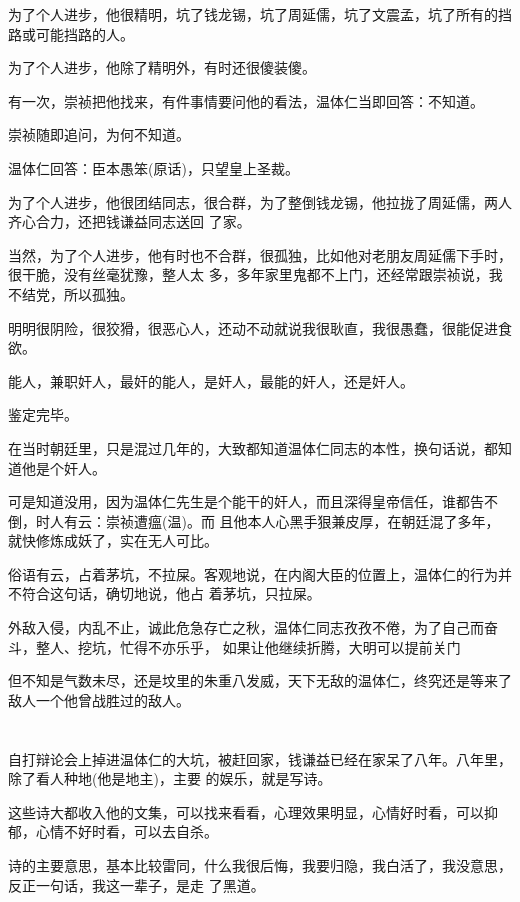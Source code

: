 \documentclass[11pt,a4paper,onecolumn]{article}
\begin{document}
为了个人进步，他很精明，坑了钱龙锡，坑了周延儒，坑了文震孟，坑了所有的挡路或可能挡路的人。

为了个人进步，他除了精明外，有时还很傻\myrule 装傻。

有一次，崇祯把他找来，有件事情要问他的看法，温体仁当即回答：不知道。

崇祯随即追问，为何不知道。

温体仁回答：臣本愚笨(原话)，只望皇上圣裁。

为了个人进步，他很团结同志，很合群，为了整倒钱龙锡，他拉拢了周延儒，两人齐心合力，还把钱谦益同志送回
了家。

当然，为了个人进步，他有时也不合群，很孤独，比如他对老朋友周延儒下手时，很干脆，没有丝毫犹豫，整人太
多，多年家里鬼都不上门，还经常跟崇祯说，我不结党，所以孤独。

明明很阴险，很狡猾，很恶心人，还动不动就说我很耿直，我很愚蠢，很能促进食欲。

能人，兼职奸人，最奸的能人，是奸人，最能的奸人，还是奸人。

鉴定完毕。

在当时朝廷里，只是混过几年的，大致都知道温体仁同志的本性，换句话说，都知道他是个奸人。

可是知道没用，因为温体仁先生是个能干的奸人，而且深得皇帝信任，谁都告不倒，时人有云：崇祯遭瘟(温)。而
且他本人心黑手狠兼皮厚，在朝廷混了多年，就快修炼成妖了，实在无人可比。

俗语有云，占着茅坑，不拉屎。客观地说，在内阁大臣的位置上，温体仁的行为并不符合这句话，确切地说，他占
着茅坑，只拉屎。

外敌入侵，内乱不止，诚此危急存亡之秋，温体仁同志孜孜不倦，为了自己而奋斗，整人、挖坑，忙得不亦乐乎，
如果让他继续折腾，大明可以提前关门

但不知是气数未尽，还是坟里的朱重八发威，天下无敌的温体仁，终究还是等来了敌人\myrule 一个他曾战胜过的敌人。

\section[\thesection]{}

自打辩论会上掉进温体仁的大坑，被赶回家，钱谦益已经在家呆了八年。八年里，除了看人种地(他是地主)，主要
的娱乐，就是写诗。

这些诗大都收入他的文集，可以找来看看，心理效果明显，心情好时看，可以抑郁，心情不好时看，可以去自杀。

诗的主要意思，基本比较雷同，什么我很后悔，我要归隐，我白活了，我没意思，反正一句话，我这一辈子，是走
了黑道。
\end{document}
